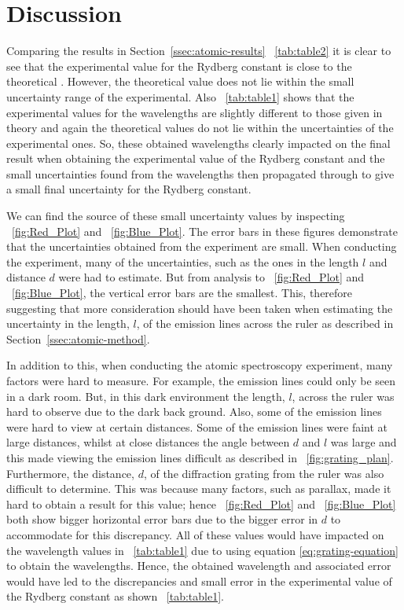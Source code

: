 \documentclass{article}
\newcommand{\figref}[2][\figurename~]{#1\ref{#2}}
\newcommand{\tabref}[2][\tablename~]{#1\ref{#2}}
\newcommand{\secref}[2][Section~]{#1\ref{#2}}
\begin{document}
\section{Discussion}
\label{sec:discussion}

Comparing the results in \secref{ssec:atomic-results} \tabref{tab:table2} it is clear to see that the experimental value for the Rydberg constant is close to the theoretical \cite{Paper01}. However, the theoretical value does not lie within the small uncertainty range of the experimental. Also \tabref{tab:table1} shows that the experimental values for the wavelengths are slightly different to those given in theory and again the theoretical values do not lie within the uncertainties of the experimental ones. So, these obtained wavelengths clearly impacted on the final result when obtaining the experimental value of the Rydberg constant and the small uncertainties found from the wavelengths then propagated through to give a small final uncertainty for the Rydberg constant.

\vspace{2mm}
\noindent
We can find the source of these small uncertainty values by inspecting \figref{fig:Red_Plot} and \figref{fig:Blue_Plot}. The error bars in these figures demonstrate that the uncertainties obtained from the experiment are small. When conducting the experiment, many of the uncertainties, such as the ones in the length $l$ and distance $d$ were had to estimate. But from analysis to \figref{fig:Red_Plot} and \figref{fig:Blue_Plot}, the vertical error bars are the smallest. This, therefore suggesting that more consideration should have been taken when estimating the uncertainty in the length, $l$, of the emission lines across the ruler as described in \secref{ssec:atomic-method}.

\vspace{2mm}
\noindent
In addition to this, when conducting the atomic spectroscopy experiment, many factors were hard to measure. For example, the emission lines could only be seen in a dark room. But, in this dark environment the length, $l$, across the ruler was hard to observe due to the dark back ground. Also, some of the emission lines were hard to view at certain distances. Some of the emission lines were faint at large distances, whilst at close distances the angle between $d$ and $l$ was large and this made viewing the emission lines difficult as described in \figref{fig:grating_plan}. Furthermore, the distance, $d$, of the diffraction grating from the ruler was also difficult to determine. This was because many factors, such as parallax, made it hard to obtain a result for this value; hence \figref{fig:Red_Plot} and \figref{fig:Blue_Plot} both show bigger horizontal error bars due to the bigger error in $d$ to accommodate for this discrepancy. All of these values would have impacted on the wavelength values in \tabref{tab:table1} due to using equation \eqref{eq:grating-equation} to obtain the wavelengths. Hence, the obtained wavelength and associated error would have led to the discrepancies and small error in the experimental value of the Rydberg constant as shown \tabref{tab:table1}. 
\end{document}
